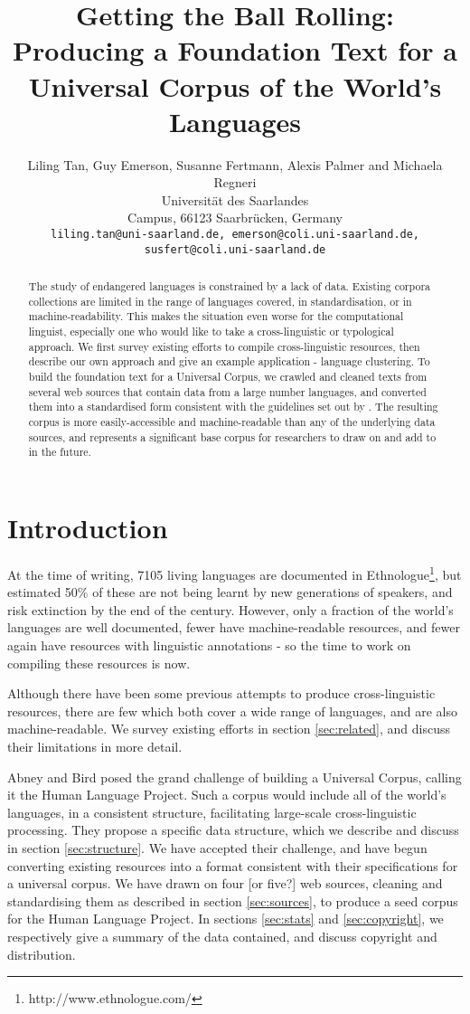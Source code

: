 \documentclass[11pt]{article}
\title{Getting the Ball Rolling: Producing a Foundation Text for a Universal Corpus of the World's Languages}
\author{Liling Tan, Guy Emerson, Susanne Fertmann, Alexis Palmer and Michaela Regneri \\
  Universität des Saarlandes \\
  Campus, 66123 Saarbrücken, Germany \\
  {\tt liling.tan@uni-saarland.de, emerson@coli.uni-saarland.de,} \\
  {\tt susfert@coli.uni-saarland.de}}
\date{}
\begin{document}
\maketitle
\begin{abstract}
The study of endangered languages is constrained by a lack of data. Existing corpora collections are limited in the range of languages covered, in standardisation, or in machine-readability. This makes the situation even worse for the computational linguist, especially one who would like to take a cross-linguistic or typological approach. We first survey existing efforts to compile cross-linguistic resources, then describe our own approach and give an example application - language clustering. To build the foundation text for a Universal Corpus, we crawled and cleaned texts from several web sources that contain data from a large number languages, and converted them into a standardised form consistent with the guidelines set out by . The resulting corpus is more easily-accessible and machine-readable than any of the underlying data sources, and represents a significant base corpus for researchers to draw on and add to in the future.
\end{abstract}

\section{Introduction}

At the time of writing, 7105 living languages are documented in Ethnologue\footnote{http://www.ethnologue.com/}, but  estimated 50\% of these are not being learnt by new generations of speakers, and risk extinction by the end of the century. However, only a fraction of the world's languages are well documented, fewer have machine-readable resources, and fewer again have resources with linguistic annotations \cite{maxwell2006annotation} - so the time to work on compiling these resources is now.

Although there have been some previous attempts to produce cross-linguistic resources, there are few which both cover a wide range of languages, and are also machine-readable. We survey existing efforts in section \ref{sec:related}, and discuss their limitations in more detail.

Abney and Bird  posed the grand challenge of building a Universal Corpus, calling it the Human Language Project. Such a corpus would include all of the world's languages, in a consistent structure, facilitating large-scale cross-linguistic processing. They propose a specific data structure, which we describe and discuss in section \ref{sec:structure}. We have accepted their challenge, and have begun converting existing resources into a format consistent with their specifications for a universal corpus. We have drawn on four [or five?] web sources, cleaning and standardising them as described in section \ref{sec:sources}, to produce a seed corpus for the Human Language Project. In sections \ref{sec:stats} and \ref{sec:copyright}, we respectively give a summary of the data contained, and discuss copyright and distribution.
\end{document}
